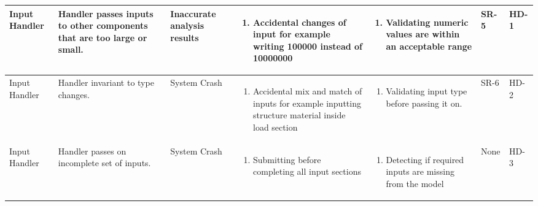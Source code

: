 \documentclass{article}
\begin{document}
\begin{landscape}
\begin{longtable}{|p{} | p{} | p{} | p{} | p{} | p{} | p{}|}
  \hline

  Input Handler & Handler passes inputs to other components that are too large or small.
  & Inaccurate analysis results &
  \begin{enumerate}[leftmargin=*, label={\alph*.}, itemsep=1pt, topsep=0pt, partopsep=0pt] 
      \item Accidental changes of input for example writing 100000 instead of 10000000  
  \end{enumerate} &
  \begin{enumerate}[leftmargin=*, label={\alph*.}, itemsep=1pt, topsep=0pt, partopsep=0pt] 
    \item Validating numeric values are within an acceptable range   
  \end{enumerate} &
  SR-5 & HD-1 \\

  \hline

  Input Handler & Handler invariant to type changes. & System Crash &
  \begin{enumerate}[leftmargin=*, label={\alph*.}, itemsep=1pt, topsep=0pt, partopsep=0pt] 
      \item Accidental mix and match of inputs for example inputting structure material inside load section
  \end{enumerate} &
  \begin{enumerate}[leftmargin=*, label={\alph*.}, itemsep=1pt, topsep=0pt, partopsep=0pt] 
    \item Validating input type before passing it on.    
  \end{enumerate} &
  SR-6 & HD-2 \\

  \hline

  Input Handler & Handler passes on incomplete set of inputs. & System Crash &
  \begin{enumerate}[leftmargin=*, label={\alph*.}, itemsep=1pt, topsep=0pt, partopsep=0pt] 
    \item Submitting before completing all input sections 
  \end{enumerate} &
  \begin{enumerate}[leftmargin=*, label={\alph*.}, itemsep=1pt, topsep=0pt, partopsep=0pt] 
    \item Detecting if required inputs are missing from the model   
  \end{enumerate} &
  None & HD-3 \\

  \hline


\end{longtable}
\end{landscape}
\end{document}
